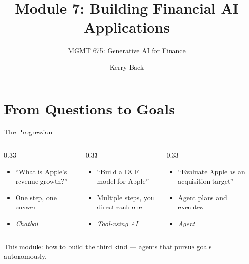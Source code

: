 \documentclass[aspectratio=169]{beamer}
\subtitle{MGMT 675: Generative AI for Finance}
\title{Module 7: Building Financial AI Applications}
\author{Kerry Back}
\date{}
\begin{document}
\maketitle

\section{From Questions to Goals}

\begin{frame}{The Progression}
\begin{columns}[T]
\begin{column}{0.33\textwidth}
\begin{shadedbox}[title=\textbf{Question}]
\begin{itemize}\small
  \item ``What is Apple's revenue growth?''
  \item One step, one answer
  \item \textit{Chatbot}
\end{itemize}
\end{shadedbox}
\end{column}
\begin{column}{0.33\textwidth}
\begin{shadedbox}[title=\textbf{Task}]
\begin{itemize}\small
  \item ``Build a DCF model for Apple''
  \item Multiple steps, you direct each one
  \item \textit{Tool-using AI}
\end{itemize}
\end{shadedbox}
\end{column}
\begin{column}{0.33\textwidth}
\begin{shadedbox}[title=\textbf{Goal}]
\begin{itemize}\small
  \item ``Evaluate Apple as an acquisition target''
  \item Agent plans and executes
  \item \textit{Agent}
\end{itemize}
\end{shadedbox}
\end{column}
\end{columns}
\vspace{0.3cm}
\begin{center}
This module: how to build the third kind --- \alert{agents that pursue goals autonomously}.
\end{center}
\end{frame}
\end{document}
